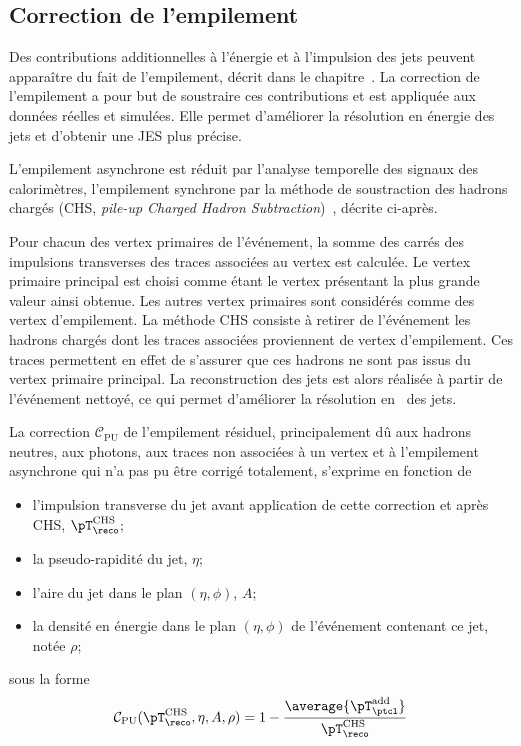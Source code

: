 \subsection{Correction de l'empilement}\label{chapter-JERC-section-CMS-subsec-PU}
Des contributions additionnelles à l'énergie et à l'impulsion des jets peuvent apparaître du fait de l'empilement, décrit dans le chapitre~.
La correction de l'empilement a pour but de soustraire ces contributions et est appliquée aux données réelles et simulées.
Elle permet d'améliorer la résolution en énergie des jets et d'obtenir une JES plus précise.
\par L'empilement asynchrone est réduit par l'analyse temporelle des signaux des calorimètres,
l'empilement synchrone par la méthode de soustraction des hadrons chargés (CHS, \emph{pile-up Charged Hadron Subtraction})~\cite{CMS-PAS-JME-14-001}, décrite ci-après.
\par
Pour chacun des vertex primaires de l'événement, la somme des carrés des impulsions transverses des traces associées au vertex est calculée.
Le vertex primaire principal est choisi comme étant le vertex présentant la plus grande valeur ainsi obtenue.
Les autres vertex primaires sont considérés comme des vertex d'empilement.
La méthode CHS consiste à retirer de l'événement les hadrons chargés dont les traces associées proviennent de vertex d'empilement.
Ces traces permettent en effet de s'assurer que ces hadrons ne sont pas issus du vertex primaire principal.
La reconstruction des jets est alors réalisée à partir de l'événement nettoyé, ce qui permet d'améliorer la résolution en \pT\ des jets.
\par La correction $\mathcal{C}_\text{PU}$ de l'empilement résiduel, principalement dû aux hadrons neutres, aux photons, aux traces non associées à un vertex et à l'empilement asynchrone qui n'a pas pu être corrigé totalement, s'exprime en fonction de
\begin{itemize}
\item l'impulsion transverse du jet avant application de cette correction et après CHS, $\pT_\reco^\text{CHS}$;
\item la pseudo-rapidité du jet, $\eta$;
\item l'aire du jet dans le plan $(\eta, \phi)$, $A$;
\item la densité en énergie dans le plan $(\eta, \phi)$ de l'événement contenant ce jet, notée $\rho$;
\end{itemize}
sous la forme
\begin{equation}
\mathcal{C}_\text{PU}(\pT_\reco^\text{CHS}, \eta, A, \rho)
= 1 - \frac{\average{\pT_\ptcl^\text{add}}}{\pT_\reco^\text{CHS}}
\label{eq-chapter-JERC-section-CMS-subsec-PU-offset_corr_v2}
\end{equation}

